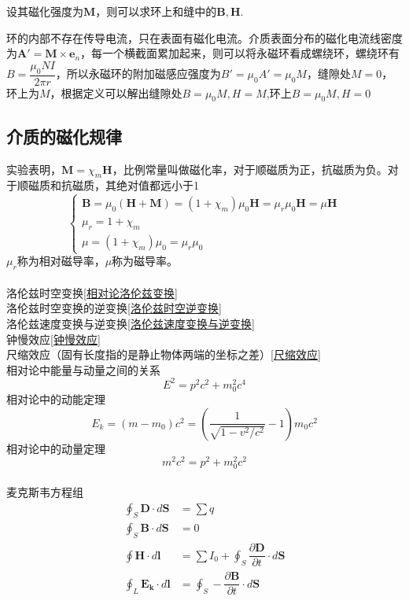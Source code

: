 设其磁化强度为$\bm{M}$，则可以求环上和缝中的$\bm{B},\bm{H}$.

环的内部不存在传导电流，只在表面有磁化电流。介质表面分布的磁化电流线密度为$\bm{A'}=\bm{M}\times \bm{e}_n$，每一个横截面累加起来，则可以将永磁环看成螺绕环，螺绕环有$B=\dfrac{\mu_0 N I}{2\pi r}$，所以永磁环的附加磁感应强度为$B'=\mu_0 A'=\mu_0 M$，缝隙处$M=0$，环上为$M$，根据定义可以解出缝隙处$B=\mu_0 M,H=M$,环上$B=\mu_0 M,H=0$
\subsection{介质的磁化规律}
实验表明，$\bm{M}=\chi_m\bm{H}$，比例常量叫做磁化率，对于顺磁质为正，抗磁质为负。对于顺磁质和抗磁质，其绝对值都远小于1
\begin{equation}
    \begin{cases}
        \bm{B}=\mu_0(\bm{H}+\bm{M})=(1+\chi_m)\mu_0 \bm{H}=\mu_r \mu_0 \bm{H}=\mu \bm{H}\\
        \mu_r = 1+ \chi_m\\
        \mu = (1+\chi_m)\mu_0=\mu_r \mu_0
    \end{cases}
\end{equation}
$\mu_r$称为相对磁导率，$\mu$称为磁导率。
\newline
\newline
{}\\ \label{回到相对论总结}
\\
洛伦兹时空变换\ref{相对论洛伦兹变换}\\
洛伦兹时空变换的逆变换\ref{洛伦兹时空逆变换}\\
洛伦兹速度变换与逆变换\ref{洛伦兹速度变换与逆变换}\\
钟慢效应\ref{钟慢效应}\\
尺缩效应（固有长度指的是静止物体两端的坐标之差）\ref{尺缩效应}\\
相对论中能量与动量之间的关系
\begin{equation}
    E^2=p^2c^2+m_0^2c^4
\end{equation}
相对论中的动能定理
\begin{equation}
    E_k=(m-m_0)c^2=(\dfrac{1}{\sqrt{1-v^2/c^2}}-1)m_0c^2
\end{equation}
相对论中的动量定理
\begin{equation}
    m^2c^2=p^2+m_0^2c^2
\end{equation}
\\
麦克斯韦方程组
\begin{align}
    \oint_S \bm{D}\cdot d\bm{S}&=\sum q\\
    \oint_S \bm{B}\cdot d\bm{S}&=0\\
    \oint \bm{H}\cdot d\bm{l}&=\sum I_0+\oint_S\dfrac{\partial \bm{D}}{\partial t}\cdot d\bm{S}\\
    \oint_L\bm{E_k}\cdot d\bm{l}&=\oint_S- \dfrac{\partial \bm{B}}{\partial t}  \cdot d\bm{S}
\end{align}
